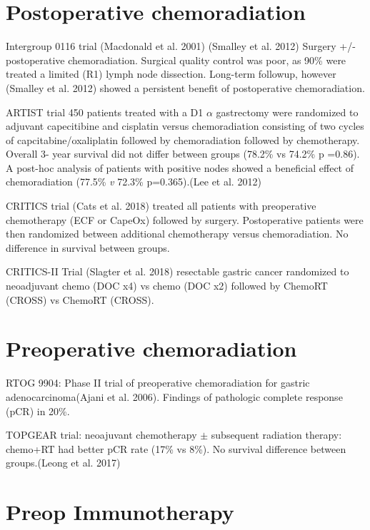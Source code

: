 \documentclass[
  letterpaper,
]{scrbook}
\begin{document}
\section{Postoperative
chemoradiation}\label{postoperative-chemoradiation-1}

Intergroup 0116 trial (Macdonald et al. 2001) (Smalley et al. 2012)
Surgery +/- postoperative chemoradiation. Surgical quality control was
poor, as 90\% were treated a limited (R1) lymph node dissection.
Long-term followup, however (Smalley et al. 2012) showed a persistent
benefit of postoperative chemoradiation.

ARTIST trial 450 patients treated with a D1 \(\alpha\) gastrectomy were
randomized to adjuvant capecitibine and cisplatin versus chemoradiation
consisting of two cycles of capcitabine/oxaliplatin followed by
chemoradiation followed by chemotherapy. Overall 3- year survival did
not differ between groups (78.2\% vs 74.2\% p =0.86). A post-hoc
analysis of patients with positive nodes showed a beneficial effect of
chemoradiation (77.5\% \emph{v} 72.3\% p=0.365).(Lee et al. 2012)

CRITICS trial (Cats et al. 2018) treated all patients with preoperative
chemotherapy (ECF or CapeOx) followed by surgery. Postoperative patients
were then randomized between additional chemotherapy versus
chemoradiation. No difference in survival between groups.

CRITICS-II Trial (Slagter et al. 2018) resectable gastric cancer
randomized to neoadjuvant chemo (DOC x4) vs chemo (DOC x2) followed by
ChemoRT (CROSS) vs ChemoRT (CROSS).

\section{Preoperative chemoradiation}\label{preoperative-chemoradiation}

RTOG 9904: Phase II trial of preoperative chemoradiation for gastric
adenocarcinoma(Ajani et al. 2006). Findings of pathologic complete
response (pCR) in 20\%.

TOPGEAR trial: neoajuvant chemotherapy \(\pm\) subsequent radiation
therapy: chemo+RT had better pCR rate (17\% vs 8\%). No survival
difference between groups.(Leong et al. 2017)

\section{Preop Immunotherapy}\label{preop-immunotherapy}
\end{document}
